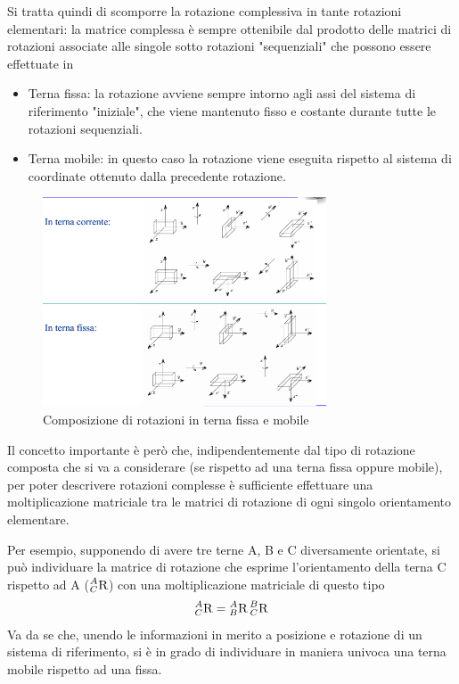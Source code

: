 \label{text:ComposizioneRotazioni}Si tratta quindi di scomporre la rotazione complessiva in tante rotazioni elementari: la matrice complessa è sempre ottenibile dal prodotto delle matrici di rotazioni associate alle singole sotto rotazioni "sequenziali" che possono essere effettuate in 
\begin{itemize}
	\item Terna fissa: la rotazione avviene sempre intorno agli assi del sistema di riferimento "iniziale", che viene mantenuto fisso e costante durante tutte le rotazioni sequenziali.
	\item Terna mobile: in questo caso la rotazione viene eseguita rispetto al sistema di coordinate ottenuto dalla precedente rotazione.
\end{itemize}
\begin{figure}
	\centering
	\includegraphics[width=0.75\textwidth]{Immagini/Rot_TernaFissaMobile}
	\caption{Composizione di rotazioni in terna fissa e mobile \cite{book:RobotIndustriali}}
	\label{fig:Rot_TernaFissa_Mobile}
\end{figure}
Il concetto importante è però che, indipendentemente dal tipo di rotazione composta che si va a considerare (se rispetto ad una terna fissa oppure mobile), per poter descrivere rotazioni complesse è sufficiente effettuare una moltiplicazione matriciale tra le matrici di rotazione di ogni singolo orientamento elementare.

Per esempio, supponendo di avere tre terne A, B e C diversamente orientate, si può individuare la matrice di rotazione che esprime l'orientamento della terna C rispetto ad A ($\prescript{A}{C}{\textsc{R}}$) con una moltiplicazione matriciale di questo tipo
\begin{equation}
	\prescript{A}{C}{\textsc{R}}=\prescript{A}{B}{\textsc{R}} \prescript{B}{C}{\textsc{R}}
\end{equation}
Va da se che, unendo le informazioni in merito a posizione e rotazione di un sistema di riferimento, si è in grado di individuare in maniera univoca una terna mobile rispetto ad una fissa. 

